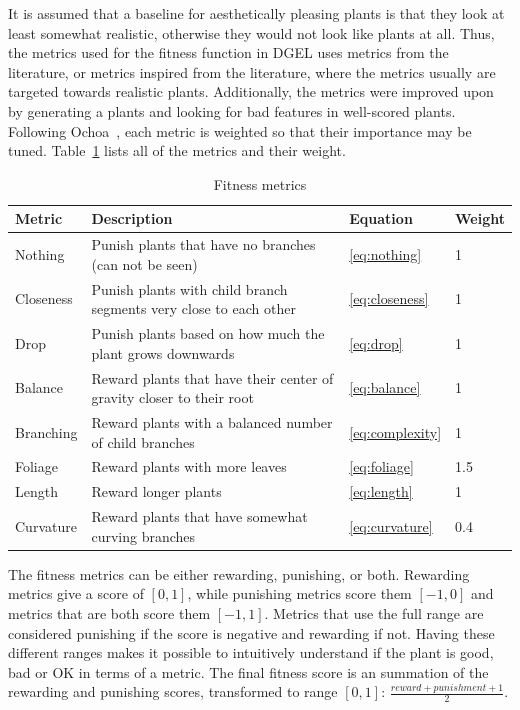 It is assumed that a baseline for aesthetically pleasing plants is that they look at least somewhat realistic, otherwise they would not look like plants at all.
Thus, the metrics used for the fitness function in \gls{DGEL} uses metrics from the literature, or metrics inspired from the literature, where the metrics usually are targeted towards realistic plants.
Additionally, the metrics were improved upon by generating a plants and looking for bad features in well-scored plants.
Following Ochoa~\cite{1998Ochoa}, each metric is weighted so that their importance may be tuned.
Table~\ref{tab:fitness} lists all of the metrics and their weight.

\begin{table}
    \centering
    \begin{tabularx}{\textwidth}{| l | X | l | l |}
    \hline
    \textbf{Metric} & \textbf{Description} & \textbf{Equation} & \textbf{Weight} \\
    \hline
    Nothing & Punish plants that have no branches (can not be seen) & \ref{eq:nothing} & 1 \\
    \hline
    Closeness & Punish plants with child \glspl{branch segment} very close to each other & \ref{eq:closeness} & 1 \\
    \hline
    Drop & Punish plants based on how much the plant grows downwards & \ref{eq:drop} & 1 \\
    \hline
    Balance & Reward plants that have their center of gravity closer to their root & \ref{eq:balance} & 1 \\
    \hline
    Branching & Reward plants with a balanced number of child branches & \ref{eq:complexity} & 1 \\
    \hline
    Foliage & Reward plants with more leaves & \ref{eq:foliage} & 1.5 \\
    \hline
    Length & Reward longer plants & \ref{eq:length} & 1 \\
    \hline
    Curvature & Reward plants that have somewhat curving branches & \ref{eq:curvature} & 0.4 \\
    \hline
    \end{tabularx}
    \caption{Fitness metrics}
    \label{tab:fitness}
\end{table}

The fitness metrics can be either rewarding, punishing, or both.
Rewarding metrics give a score of $[0,1]$, while punishing metrics score them $[-1,0]$ and metrics that are both score them $[-1,1]$.
Metrics that use the full range are considered punishing if the score is negative and rewarding if not.
Having these different ranges makes it possible to intuitively understand if the plant is good, bad or OK in terms of a metric.
The final fitness score is an summation of the rewarding and punishing scores, transformed to range $[0,1]$: $\frac{reward + punishment + 1}{2}$.

